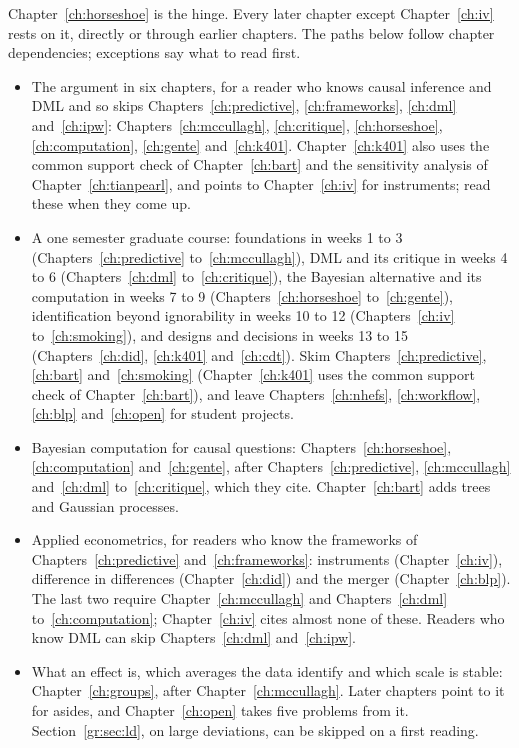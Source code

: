 Chapter~\ref{ch:horseshoe} is the hinge. Every later chapter except Chapter~\ref{ch:iv} rests on it, directly or through earlier chapters. The paths below follow chapter dependencies; exceptions say what to read first.

\begin{itemize}
\item The argument in six chapters, for a reader who knows causal inference and DML and so skips Chapters~\ref{ch:predictive}, \ref{ch:frameworks}, \ref{ch:dml} and~\ref{ch:ipw}: Chapters~\ref{ch:mccullagh}, \ref{ch:critique}, \ref{ch:horseshoe}, \ref{ch:computation}, \ref{ch:gente} and~\ref{ch:k401}. Chapter~\ref{ch:k401} also uses the common support check of Chapter~\ref{ch:bart} and the sensitivity analysis of Chapter~\ref{ch:tianpearl}, and points to Chapter~\ref{ch:iv} for instruments; read these when they come up.
\item A one semester graduate course: foundations in weeks 1 to 3 (Chapters~\ref{ch:predictive} to~\ref{ch:mccullagh}), DML and its critique in weeks 4 to 6 (Chapters~\ref{ch:dml} to~\ref{ch:critique}), the Bayesian alternative and its computation in weeks 7 to 9 (Chapters~\ref{ch:horseshoe} to~\ref{ch:gente}), identification beyond ignorability in weeks 10 to 12 (Chapters~\ref{ch:iv} to~\ref{ch:smoking}), and designs and decisions in weeks 13 to 15 (Chapters~\ref{ch:did}, \ref{ch:k401} and~\ref{ch:cdt}). Skim Chapters~\ref{ch:predictive}, \ref{ch:bart} and~\ref{ch:smoking} (Chapter~\ref{ch:k401} uses the common support check of Chapter~\ref{ch:bart}), and leave Chapters~\ref{ch:nhefs}, \ref{ch:workflow}, \ref{ch:blp} and~\ref{ch:open} for student projects.
\item Bayesian computation for causal questions: Chapters~\ref{ch:horseshoe}, \ref{ch:computation} and~\ref{ch:gente}, after Chapters~\ref{ch:predictive}, \ref{ch:mccullagh} and~\ref{ch:dml} to~\ref{ch:critique}, which they cite. Chapter~\ref{ch:bart} adds trees and Gaussian processes.
\item Applied econometrics, for readers who know the frameworks of Chapters~\ref{ch:predictive} and~\ref{ch:frameworks}: instruments (Chapter~\ref{ch:iv}), difference in differences (Chapter~\ref{ch:did}) and the merger (Chapter~\ref{ch:blp}). The last two require Chapter~\ref{ch:mccullagh} and Chapters~\ref{ch:dml} to~\ref{ch:computation}; Chapter~\ref{ch:iv} cites almost none of these. Readers who know DML can skip Chapters~\ref{ch:dml} and~\ref{ch:ipw}.
\item What an effect is, which averages the data identify and which scale is stable: Chapter~\ref{ch:groups}, after Chapter~\ref{ch:mccullagh}. Later chapters point to it for asides, and Chapter~\ref{ch:open} takes five problems from it. Section~\ref{gr:sec:ld}, on large deviations, can be skipped on a first reading.
\end{itemize}

